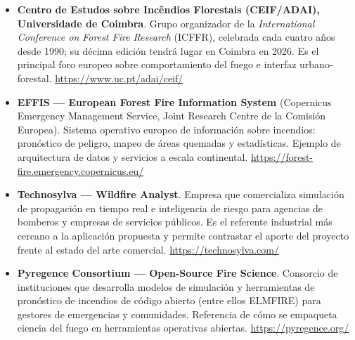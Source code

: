 \begin{itemize}
    \item \textbf{Centro de Estudos sobre Incêndios Florestais (CEIF/ADAI), Universidade de Coimbra}. Grupo organizador de la \emph{International Conference on Forest Fire Research} (ICFFR), celebrada cada cuatro años desde 1990; su décima edición tendrá lugar en Coimbra en 2026. Es el principal foro europeo sobre comportamiento del fuego e interfaz urbano-forestal. \url{https://www.uc.pt/adai/ceif/}
    \item \textbf{EFFIS --- European Forest Fire Information System} (Copernicus Emergency Management Service, Joint Research Centre de la Comisión Europea). Sistema operativo europeo de información sobre incendios: pronóstico de peligro, mapeo de áreas quemadas y estadísticas. Ejemplo de arquitectura de datos y servicios a escala continental. \url{https://forest-fire.emergency.copernicus.eu/}
    \item \textbf{Technosylva --- Wildfire Analyst}. Empresa que comercializa simulación de propagación en tiempo real e inteligencia de riesgo para agencias de bomberos y empresas de servicios públicos. Es el referente industrial más cercano a la aplicación propuesta y permite contrastar el aporte del proyecto frente al estado del arte comercial. \url{https://technosylva.com/}
    \item \textbf{Pyregence Consortium --- Open-Source Fire Science}. Consorcio de instituciones que desarrolla modelos de simulación y herramientas de pronóstico de incendios de código abierto (entre ellos ELMFIRE) para gestores de emergencias y comunidades. Referencia de cómo se empaqueta ciencia del fuego en herramientas operativas abiertas. \url{https://pyregence.org/}
\end{itemize}